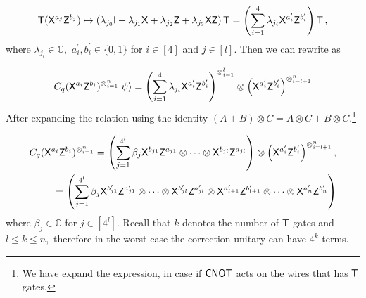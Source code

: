 \begin{equation}
\begin{aligned}
\label{nqubit:eq7}
{\sf T}({\sf X}^{a_{j}}{\sf Z}^{b_{j}})\mapsto \left(\lambda_{j_0} {\sf I} + \lambda_{j_1} {\sf X} + \lambda_{j_2} {\sf Z} + \lambda_{j_3} {\sf X} {\sf Z} \right){\sf T}=\left(\sum_{i=1}^4 \lambda_{j_i} {\sf X}^{a_{i}^\prime}{\sf Z}^{b_{i}^\prime}\right){\sf T}\,,\\
 \end{aligned}
\end{equation}
where $\lambda_{j_i}\in\mathbb{C}, $  $a_{i}^\prime, b_{i}^\prime \in\{0,1\}$ for $i\in[4]$ and $j\in[l].$ Then we can rewrite  as


\begin{equation}
\label{nqubit:eq8}
\begin{aligned}
 C_q ({\sf X}^{a_{i}}{\sf Z}^{b_{i}})^{\otimes_{i=1}^{n}}{\lvert}\psi\rangle= \left(\sum_{i=1}^4 \lambda_{j_i} {\sf X}^{a_{i}^\prime}{\sf Z}^{b_{i}^\prime}\right)^{\otimes_{i=1}^{l}} \otimes \left({\sf X}^{a_{i}^\prime}{\sf Z}^{b_{i}^\prime}\right)^{\otimes_{i=l+1}^{n}}\\
\end{aligned}
\end{equation}
After expanding the relation  using the identity $(A+B)\otimes C=A\otimes C + B\otimes C$.\footnote{We have expand the expression, in case if ${\sf CNOT}$ acts on the wires that has ${\sf T}$ gates.} %


\begin{equation}
\label{nqubit:eq9}
\begin{aligned}
C_q ({\sf X}^{a_{i}}{\sf Z}^{b_{i}})^{\otimes_{i=1}^{n}}=\left(\sum_{j=1}^{4^l} \beta_j {\sf X}^{b_{j1}}{\sf Z}^{a_{j1}} \otimes \cdots \otimes{\sf X}^{b_{jl}}{\sf Z}^{a_{jl}}\right) \otimes \left({\sf X}^{a_{i}^\prime}{\sf Z}^{b_{i}^\prime}\right)^{\otimes_{i=l+1}^{n}}, \\
 =\left(\sum_{j=1}^{4^{l}} \beta_j {\sf X}^{b_{j1}^\prime}{\sf Z}^{a_{j1}^\prime} \otimes \cdots \otimes{\sf X}^{b_{jl}^\prime}{\sf Z}^{a_{jl}^\prime} \otimes {\sf X}^{a_{l+1}^\prime}{\sf Z}^{b_{l+1}^\prime}  \otimes \cdots   \otimes{\sf X}^{a_{n}^\prime}{\sf Z}^{b_{n}^\prime}\right)
 \end{aligned}
\end{equation}
where $\beta_j\in \mathbb{C}$ for $j\in[4^l].$  Recall that $k$ denotes the number of ${\sf T}$ gates and $l\leq k\leq n,$ therefore in the worst case the correction unitary can have $4^k$ terms.



